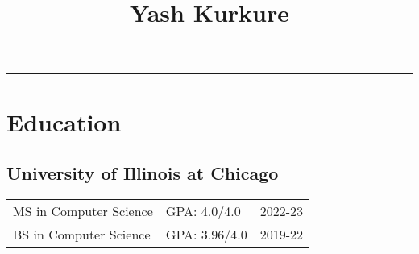 \documentclass[12pt]{article}
\title{Yash Kurkure\vspace{-3em}}
\date{}
\begin{document}
\maketitle
\par\noindent\rule{\textwidth}{0.4pt}


\section*{Education}

\subsection*{University of Illinois at Chicago}
\begin{tabularx}{\textwidth}{l@{\hskip 2.5in}Xr}
	MS in Computer Science & GPA: 4.0/4.0 & 2022-23 \\
	BS in Computer Science & GPA: 3.96/4.0 & 2019-22 \\
\end{tabularx}
\end{document}
